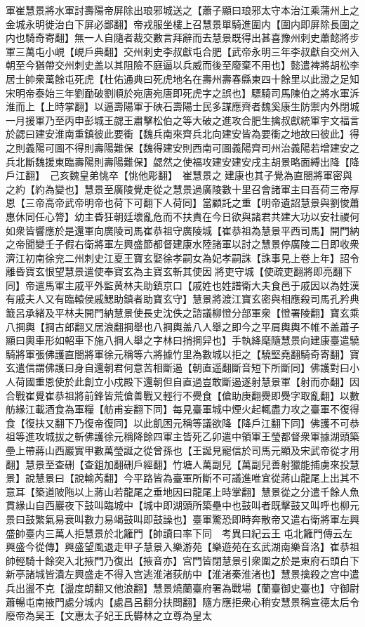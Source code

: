 軍崔慧景將水軍討壽陽帝屏除出琅邪城送之【蕭子顯曰琅邪太守本治江乘蒲州上之金城永明徙治白下屏必鄙翻】帝戎服坐樓上召慧景單騎進圍内【圍内即屏除長圍之内也騎奇寄翻】無一人自隨者裁交數言拜辭而去慧景既得出甚喜豫州刺史蕭懿將步軍三萬屯小峴【峴戶典翻】交州刺史李叔獻屯合肥【武帝永明三年李叔獻自交州入朝至今猶帶交州刺史盖以其阻險不庭逼以兵威而後至廢棄不用也】懿遣裨將胡松李居士帥衆萬餘屯死虎【杜佑通典曰死虎地名在壽州壽春縣東四十餘里以此證之足知宋明帝泰始三年劉勔破劉順於宛唐宛唐即死虎字之誤也】驃騎司馬陳伯之將水軍泝淮而上【上時掌翻】以逼壽陽軍于硤石壽陽士民多謀應齊者魏奚康生防禦内外閉城一月援軍乃至丙申彭城王勰王肅擊松伯之等大破之進攻合肥生擒叔獻統軍宇文福言於勰曰建安淮南重鎮彼此要衝【魏兵南來齊兵北向建安皆為要衝之地故曰彼此】得之則義陽可圖不得則壽陽難保【魏得建安則西南可圖義陽齊司州治義陽若增建安之兵北斷魏援東臨壽陽則壽陽難保】勰然之使福攻建安建安戌主胡景略面縛出降【降戶江翻】　己亥魏皇弟恌卒【恌他彫翻】　崔慧景之建康也其子覺為直閤將軍密與之約【約為變也】慧景至廣陵覺走從之慧景過廣陵數十里召會諸軍主曰吾荷三帝厚恩【三帝高帝武帝明帝也荷下可翻下人荷同】當顧託之重【明帝遺詔慧景與劉悛蕭惠休同任心膂】幼主昏狂朝廷壞亂危而不扶責在今日欲與諸君共建大功以安社禝何如衆皆響應於是還軍向廣陵司馬崔恭祖守廣陵城【崔恭祖為慧景平西司馬】開門納之帝聞變壬子假右衛將軍左興盛節都督建康水陸諸軍以討之慧景停廣陵二日即收衆濟江初南徐兖二州刺史江夏王寶玄娶徐孝嗣女為妃孝嗣誅【誅事見上卷上年】詔令離昏寶玄恨望慧景遣使奉寶玄為主寶玄斬其使因將吏守城【使疏吏翻將即亮翻下同】帝遣馬軍主戚平外監黄林夫助鎮京口【戚姓也姓譜衛大夫食邑于戚因以為姓漢有戚夫人又有臨轅侯戚鰓助鎮者助寶玄守】慧景將渡江寶玄密與相應殺司馬孔矜典籖呂承緒及平林夫開門納慧景使長史沈佚之諮議柳憕分部軍衆【憕署陵翻】寶玄乘八掆輿【掆古郎翻又居浪翻掆舉也八掆輿盖八人舉之即今之平肩輿輿不帷不盖蕭子顯曰輿車形如軺車下施八掆人舉之字林曰捎掆舁也】手執絳麾隨慧景向建康臺遣驍騎將軍張佛護直閤將軍徐元稱等六將據竹里為數城以拒之【驍堅堯翻騎奇寄翻】寶玄遣信謂佛護曰身自還朝君何意苦相斷遏【朝直遥翻斷音短下所斷同】佛護對曰小人荷國重恩使於此創立小戍殿下還朝但自直過豈敢斷遏遂射慧景軍【射而亦翻】因合戰崔覺崔恭祖將前鋒皆荒傖善戰又輕行不㸑食【傖助庚翻㸑即㸑字取亂翻】以數舫緣江載酒食為軍糧【舫甫妄翻下同】每見臺軍城中煙火起輒盡力攻之臺軍不復得食【復扶又翻下乃復帝復同】以此飢困元稱等議欲降【降戶江翻下同】佛護不可恭祖等進攻城拔之斬佛護徐元稱降餘四軍主皆死乙卯遣中領軍王瑩都督衆軍據湖頭築壘上帶蔣山西巖實甲數萬瑩誕之從曾孫也【王誕見寵信於司馬元顯及宋武帝從才用翻】慧景至查硎【查鉏加翻硎戶經翻】竹塘人萬副兒【萬副兒善射獵能捕虜來投慧景】說慧景曰【說輸芮翻】今平路皆為臺軍所斷不可議進唯宜從蔣山龍尾上出其不意耳【築道陂陁以上蔣山若龍尾之垂地因曰龍尾上時掌翻】慧景從之分遣千餘人魚貫緣山自西巖夜下鼓叫臨城中【城中即湖頭所築壘中也鼓叫者既擊鼓又叫呼也柳元景曰鼓繁氣易衰叫數力易竭鼓叫即鼓譟也】臺軍驚恐即時奔散帝又遣右衛將軍左興盛帥臺内三萬人拒慧景於北籬門【帥讀曰率下同　考異曰紀云王屯北籬門傳云左興盛今從傳】興盛望風退走甲子慧景入樂游苑【樂遊苑在玄武湖南樂音洛】崔恭祖帥輕騎十餘突入北掖門乃復出【掖音亦】宫門皆閉慧景引衆圍之於是東府石頭白下新亭諸城皆潰左興盛走不得入宫逃淮渚荻舫中【淮渚秦淮渚也】慧景擒殺之宫中遣兵出盪不克【盪度朗翻又他浪翻】慧景燒蘭臺府署為戰場【蘭臺御史臺也】守御尉蕭暢屯南掖門處分城内【處昌呂翻分扶問翻】隨方應拒衆心稍安慧景稱宣德太后令廢帝為吴王【文惠太子妃王氏欎林之立尊為皇太